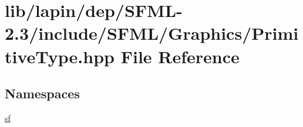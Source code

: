 \hypertarget{lapin_2dep_2_s_f_m_l-2_83_2include_2_s_f_m_l_2_graphics_2_primitive_type_8hpp}{\section{lib/lapin/dep/\-S\-F\-M\-L-\/2.3/include/\-S\-F\-M\-L/\-Graphics/\-Primitive\-Type.hpp File Reference}
\label{lapin_2dep_2_s_f_m_l-2_83_2include_2_s_f_m_l_2_graphics_2_primitive_type_8hpp}
}
\subsection*{Namespaces}
\begin{DoxyCompactItemize}
\item 
\hyperlink{namespacesf}{sf}
\end{DoxyCompactItemize}
